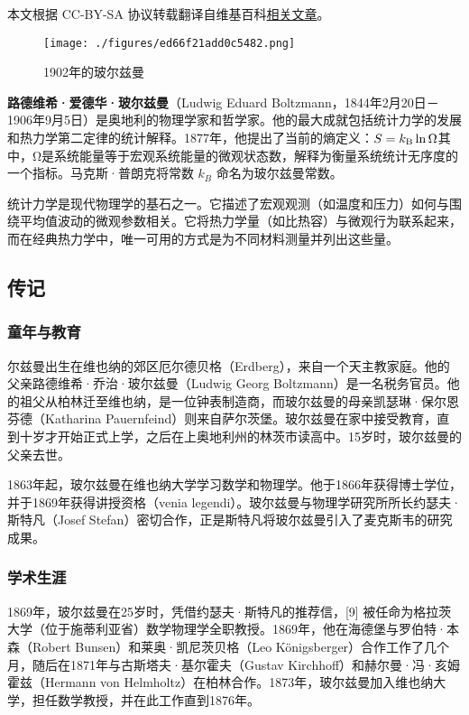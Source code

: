 
本文根据 CC-BY-SA 协议转载翻译自维基百科\href{https://en.wikipedia.org/wiki/Ludwig_Boltzmann}{相关文章}。

\begin{figure}[ht]
\centering
\texttt{[image: ./figures/ed66f21add0c5482.png]}
\caption{1902年的玻尔兹曼} \label{fig_BRZM_1}
\end{figure}
\textbf{路德维希·爱德华·玻尔兹曼}（Ludwig Eduard Boltzmann，1844年2月20日－1906年9月5日）是奥地利的物理学家和哲学家。他的最大成就包括统计力学的发展和热力学第二定律的统计解释。1877年，他提出了当前的熵定义：\(S = k_{\rm B}\ln\Omega \)其中，Ω是系统能量等于宏观系统能量的微观状态数，解释为衡量系统统计无序度的一个指标。马克斯·普朗克将常数 \( k_B \) 命名为玻尔兹曼常数。

统计力学是现代物理学的基石之一。它描述了宏观观测（如温度和压力）如何与围绕平均值波动的微观参数相关。它将热力学量（如比热容）与微观行为联系起来，而在经典热力学中，唯一可用的方式是为不同材料测量并列出这些量。
\subsection{传记}  
\subsubsection{童年与教育}  
尔兹曼出生在维也纳的郊区厄尔德贝格（Erdberg），来自一个天主教家庭。他的父亲路德维希·乔治·玻尔兹曼（Ludwig Georg Boltzmann）是一名税务官员。他的祖父从柏林迁至维也纳，是一位钟表制造商，而玻尔兹曼的母亲凯瑟琳·保尔恩芬德（Katharina Pauernfeind）则来自萨尔茨堡。玻尔兹曼在家中接受教育，直到十岁才开始正式上学，之后在上奥地利州的林茨市读高中。15岁时，玻尔兹曼的父亲去世。

1863年起，玻尔兹曼在维也纳大学学习数学和物理学。他于1866年获得博士学位，并于1869年获得讲授资格（venia legendi）。玻尔兹曼与物理学研究所所长约瑟夫·斯特凡（Josef Stefan）密切合作，正是斯特凡将玻尔兹曼引入了麦克斯韦的研究成果。
\subsubsection{学术生涯} 
1869年，玻尔兹曼在25岁时，凭借约瑟夫·斯特凡的推荐信，[9] 被任命为格拉茨大学（位于施蒂利亚省）数学物理学全职教授。1869年，他在海德堡与罗伯特·本森（Robert Bunsen）和莱奥·凯尼茨贝格（Leo Königsberger）合作工作了几个月，随后在1871年与古斯塔夫·基尔霍夫（Gustav Kirchhoff）和赫尔曼·冯·亥姆霍兹（Hermann von Helmholtz）在柏林合作。1873年，玻尔兹曼加入维也纳大学，担任数学教授，并在此工作直到1876年。
